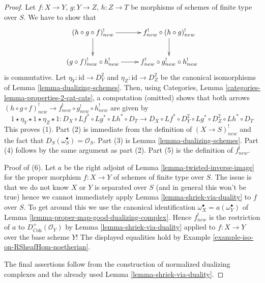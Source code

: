 \documentclass[10pt,a4paper]{amsart}
\theoremstyle{plain}
\theoremstyle{definition}
\theoremstyle{remark}
\numberwithin{equation}{subsection}
\begin{document}
\begin{proof}
Let $f : X \to Y$, $g : Y \to Z$, $h : Z \to T$ be morphisms of schemes
of finite type over $S$. We have to show that
$$
\xymatrix{
(h \circ g \circ f)^!_{new} \ar[r] \ar[d] &
f^!_{new} \circ (h \circ g)^!_{new} \ar[d] \\
(g \circ f)^!_{new} \circ h^!_{new} \ar[r] &
f^!_{new} \circ g^!_{new} \circ h^!_{new}
}
$$
is commutative. Let $\eta_Y : \text{id} \to D_Y^2$
and $\eta_Z : \text{id} \to D_Z^2$ be the canonical isomorphisms
of Lemma \ref{lemma-dualizing-schemes}. Then, using
Categories, Lemma \ref{categories-lemma-properties-2-cat-cats},
a computation (omitted) shows that both arrows
$(h \circ g \circ f)^!_{new} \to f^!_{new} \circ g^!_{new} \circ h^!_{new}$
are given by
$$
1 \star \eta_Y \star 1 \star \eta_Z \star 1 :
D_X \circ Lf^* \circ Lg^* \circ Lh^* \circ D_T
\longrightarrow
D_X \circ Lf^* \circ D_Y^2 \circ Lg^* \circ D_Z^2 \circ Lh^* \circ D_T
$$
This proves (1). Part (2) is immediate from the definition of
$(X \to S)^!_{new}$ and the fact that $D_S(\omega_S^\bullet) = \mathcal{O}_S$.
Part (3) is Lemma \ref{lemma-dualizing-schemes}.
Part (4) follows by the same argument as part (2).
Part (5) is the definition of $f^!_{new}$.

\medskip\noindent
Proof of (6). Let $a$ be the
right adjoint of Lemma \ref{lemma-twisted-inverse-image} for the
proper morphism $f : X \to Y$ of schemes of finite type over $S$.
The issue is that we do not know $X$ or $Y$ is
separated over $S$ (and in general this won't be true)
hence we cannot immediately apply
Lemma \ref{lemma-shriek-via-duality} to $f$ over $S$.
To get around this we use the canonical identification
$\omega_X^\bullet = a(\omega_Y^\bullet)$ of
Lemma \ref{lemma-proper-map-good-dualizing-complex}.
Hence $f^!_{new}$ is the restriction of $a$ to
$D_{\textit{Coh}}^+(\mathcal{O}_Y)$ by Lemma \ref{lemma-shriek-via-duality}
applied to $f : X \to Y$ over the base scheme $Y$!
The displayed equalities hold by
Example \ref{example-iso-on-RSheafHom-noetherian}.

\medskip\noindent
The final assertions follow from the construction of normalized
dualizing complexes and the already used Lemma \ref{lemma-shriek-via-duality}.
\end{proof}
\end{document}
